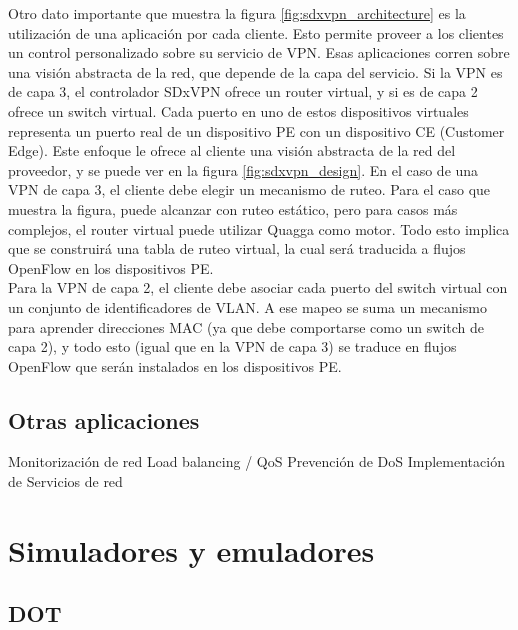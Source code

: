 Otro dato importante que muestra la figura \ref{fig:sdxvpn_architecture} es la utilización de una aplicación por cada cliente. Esto permite proveer a los clientes un control personalizado sobre su servicio de VPN. Esas aplicaciones corren sobre una visión abstracta de la red, que depende de la capa del servicio. Si la VPN es de capa 3, el controlador SDxVPN ofrece un router virtual, y si es de capa 2 ofrece un switch virtual. Cada puerto en uno de estos dispositivos virtuales representa un puerto real de un dispositivo PE con un dispositivo CE (Customer Edge). Este enfoque le ofrece al cliente una visión abstracta de la red del proveedor, y se puede ver en la figura \ref{fig:sdxvpn_design}. En el caso de una VPN de capa 3, el cliente debe elegir un mecanismo de ruteo. Para el caso que muestra la figura, puede alcanzar con ruteo estático, pero para casos más complejos, el router virtual puede utilizar Quagga como motor. Todo esto implica que se construirá una tabla de ruteo virtual, la cual será traducida a flujos OpenFlow en los dispositivos PE. \\
Para la VPN de capa 2, el cliente debe asociar cada puerto del switch virtual con un conjunto de identificadores de VLAN. A ese mapeo se suma un mecanismo para aprender direcciones MAC (ya que debe comportarse como un switch de capa 2), y todo esto (igual que en la VPN de capa 3) se traduce en flujos OpenFlow que serán instalados en los dispositivos PE.



\subsection{Otras aplicaciones}
Monitorización de red
Load balancing / QoS
Prevención de DoS
Implementación de Servicios de red

\section{Simuladores y emuladores}
\subsection{DOT} %
